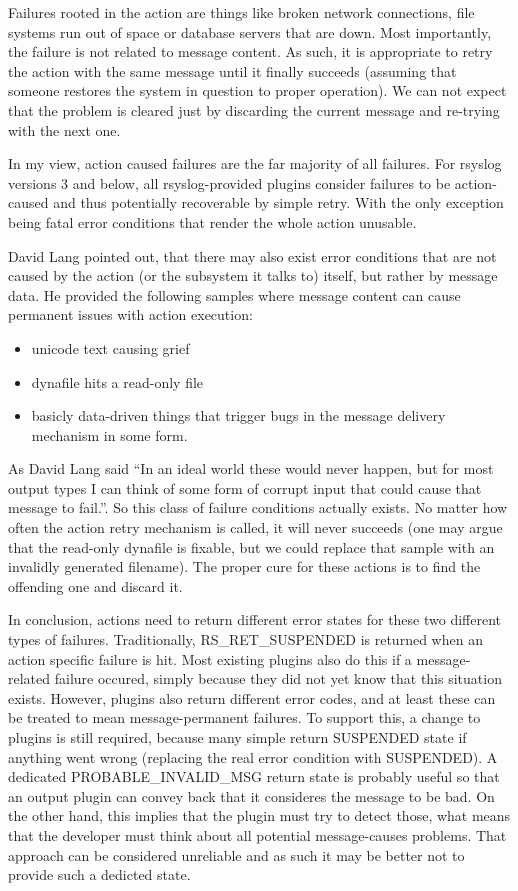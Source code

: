 \documentclass[a4paper,10pt]{article}
\begin{document}
Failures rooted in the action are things like broken network connections, file systems run out of space or database servers that are down. Most importantly, the failure is not related to message content. As such, it is appropriate to retry the action with the same message until it finally succeeds (assuming that someone restores the system in question to proper operation). We can not expect that the problem is cleared just by discarding the current message and re-trying with the next one.

In my view, action caused failures are the far majority of all failures. For rsyslog versions 3 and below, all rsyslog-provided plugins consider failures to be action-caused and thus potentially recoverable by simple retry. With the only exception being fatal error conditions that render the whole action unusable.

David Lang pointed out, that there may also exist error conditions that are not caused by the action (or the subsystem it talks to) itself, but rather by message data. He provided the following samples where message content can cause permanent issues with action execution:

\begin{itemize}
\item unicode text causing grief
\item dynafile hits a read-only file
\item basicly data-driven things that trigger bugs in the message delivery 
mechanism in some form.
\end{itemize}

As David Lang said ``In an ideal world these would never happen, but for most output types I can think of some form of corrupt input that could cause that message to fail.''.
So this class of failure conditions actually exists. No matter how often the action retry mechanism is called, it will never succeeds (one may argue that the read-only dynafile is fixable, but we could replace that sample with an invalidly generated filename). The proper cure for these actions is to find the offending one and discard it.

In conclusion, actions need to return different error states for these two different types of failures. Traditionally, RS\_RET\_SUSPENDED is returned when an action specific failure is hit. Most existing plugins also do this if a message-related failure occured, simply because they did not yet know that this situation exists. However, plugins also return different error codes, and at least these can be treated to mean message-permanent failures. To support this, a change to plugins is still required, because many simple return SUSPENDED state if anything went wrong (replacing the real error condition with SUSPENDED). A dedicated PROBABLE\_INVALID\_MSG return state is probably useful so that an output plugin can convey back that it consideres the message to be bad. On the other hand, this implies that the plugin must try to detect those, what means that the developer must think about all potential message-causes problems. That approach can be considered unreliable and as such it may be better not to provide such a dedicted state.
\end{document}
